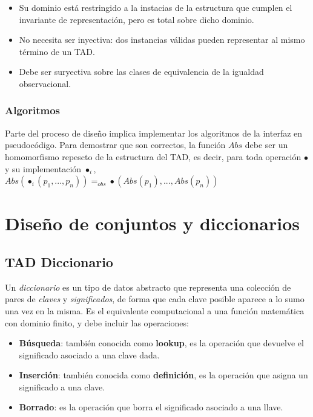 \documentclass{article}
\begin{document}
\begin{itemize}
    \item Su dominio está restringido a la instacias de la estructura que cumplen el invariante de representación, pero es total sobre dicho dominio.
    \item No necesita ser inyectiva: dos instancias válidas pueden representar al mismo término de un TAD.
    \item Debe ser suryectiva sobre las clases de equivalencia de la igualdad observacional.
\end{itemize}

\subsubsection{Algoritmos}

Parte del proceso de diseño implica implementar los algoritmos de la interfaz en pseudocódigo. Para demostrar que son correctos, la función $Abs$ debe ser un homomorfismo repescto de la estructura del TAD, es decir, para toda operación $\bullet$ y su implementación $\bullet_i$, $Abs(\bullet_i(p_1, ..., p_n)) =_{obs} \bullet(Abs(p_1), ..., Abs(p_n))$

\section{Diseño de conjuntos y diccionarios}

\subsection{TAD Diccionario}

Un \textit{diccionario} es un tipo de datos abstracto que representa una colección de pares de \textit{claves} y \textit{significados}, de forma que cada clave posible aparece a lo sumo una vez en la misma. Es el equivalente computacional a una función matemática con dominio finito, y debe incluir las operaciones:

\begin{itemize}
    \item \textbf{Búsqueda}: también conocida como \textbf{lookup}, es la operación que devuelve el significado asociado a una clave dada.
    \item \textbf{Inserción}: también conocida como \textbf{definición}, es la operación que asigna un significado a una clave.
    \item \textbf{Borrado}: es la operación que borra el significado asociado a una llave.
\end{itemize}
\end{document}
